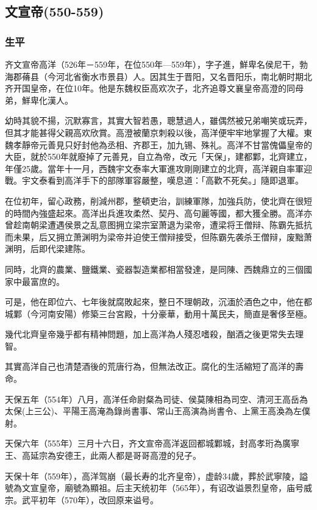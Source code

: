 
\subsection{文宣帝\tiny(550-559)}

\subsubsection{生平}

齐文宣帝高洋（526年－559年，在位550年—559年），字子進，鮮卑名侯尼干，勃海郡蓨县（今河北省衡水市景县）人。因其生于晋阳，又名晋阳乐，南北朝时期北齐开国皇帝，在位10年。他是东魏权臣高欢次子，北齐追尊文襄皇帝高澄的同母弟，鮮卑化漢人。

幼時其貌不揚，沉默寡言，其實大智若愚，聰慧過人，雖偶然被兄弟嘲笑或玩弄，但其才能甚得父親高欢欣賞。高澄被蘭京刺殺以後，高洋便牢牢地掌握了大權。東魏孝靜帝元善見只好封他為丞相、齐郡王，加九锡、殊礼。高洋不甘當傀儡皇帝的大臣，就於550年就廢掉了元善見，自立為帝，改元「天保」，建都鄴，北齊建立，年僅25歲。當年十一月，西魏宇文泰率大軍進攻剛剛建立的北齊，高洋親自率軍迎戰。宇文泰看到高洋手下的部隊軍容嚴整，嘆息道：「高歡不死矣。」隨即退軍。

在位初年，留心政務，削減州郡，整頓吏治，訓練軍隊，加強兵防，使北齊在很短的時間內強盛起來。高洋出兵進攻柔然、契丹、高句麗等國，都大獲全勝。高洋亦曾趁南朝梁遭遇侯景之乱意图拥立梁宗室萧退为梁帝，遭梁将王僧辩、陈霸先抵抗而未果，后又拥立萧渊明为梁帝并迫使王僧辩接受，但陈霸先袭杀王僧辩，废黜萧渊明，后即代梁建陈。

同時，北齊的農業、鹽鐵業、瓷器製造業都相當發達，是同陳、西魏鼎立的三個國家中最富庶的。

可是，他在即位六、七年後就腐敗起來，整日不理朝政，沉湎於酒色之中，他在都城鄴（今河南安陽）修築三台宮殿，十分豪華，動用十萬民夫，簡直是奢侈至極。

幾代北齊皇帝幾乎都有精神問題，加上高洋為人殘忍嗜殺，酗酒之後更常失去理智。

其實高洋自己也清楚酒後的荒唐行為，但無法改正。腐化的生活縮短了高洋的壽命。

天保五年（554年）八月，高洋任命尉粲為司徒、侯莫陳相為司空、清河王高岳為太保(上三公)、平陽王高淹為錄尚書事、常山王高演為尚書令、上黨王高渙為左僕射。

天保六年（555年）三月十六日，齐文宣帝高洋返回都城鄴城，封高孝珩為廣寧王、高延宗為安德王，此兩人都是哥哥高澄的兒子。

天保十年（559年），高洋驾崩（最长寿的北齐皇帝），虚龄34歲，葬於武寧陵，謚號為文宣皇帝，廟號為顯祖。后主天统初年（565年），有诏改谥景烈皇帝，庙号威宗。武平初年（570年），改回原来谥号。

